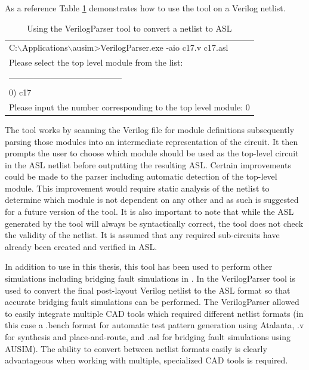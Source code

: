 \documentclass[12pt]{report}
\begin{document}
As a reference Table \ref{tbl:VerilogParserUse} demonstrates how to use the tool on a Verilog netlist.
\begin{table}
  \begin{center}
    \caption{Using the VerilogParser tool to convert a netlist to ASL}
    \begin{tabular}{|l|}
        \hline
        C:$\backslash$Applications$\backslash$ausim\textgreater VerilogParser.exe -aio c17.v c17.asl \\
        Please select the top level module from the list: \\
        -----------------------------------------\\
        0) c17 \\
        Please input the number corresponding to the top level module: 0 \\
        \hline
    \end{tabular}
    \label{tbl:VerilogParserUse}
  \end{center}
\end{table}
The tool works by scanning the Verilog file for module definitions subsequently parsing those modules into an intermediate representation of the circuit.  It then prompts the user to choose which module should be used as the top-level circuit in the ASL netlist before outputting the resulting ASL.  Certain improvements could be made to the parser including automatic detection of the top-level module.  This improvement would require static analysis of the netlist to determine which module is not dependent on any other and as such is suggested for a future version of the tool.  It is also important to note that while the ASL generated by the tool will always be syntactically correct, the tool does not check the validity of the netlist.  It is assumed that any required sub-circuits have already been created and verified in ASL.  

In addition to use in this thesis, this tool has been used to perform other simulations including bridging fault simulations in \cite{james}.  In \cite{james} the VerilogParser tool is used to convert the final post-layout Verilog netlist to the ASL format so that accurate bridging fault simulations can be performed.  The VerilogParser allowed \cite{james} to easily integrate multiple CAD tools which required different netlist formats (in this case a .bench format for automatic test pattern generation using Atalanta, .v for synthesis and place-and-route, and .asl for bridging fault simulations using AUSIM).  The ability to convert between netlist formats easily is clearly advantageous when working with multiple, specialized CAD tools is required.
\end{document}
